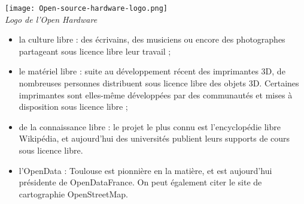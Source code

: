 \begin{minipage}{0.3\textwidth}
\begin{center}
\texttt{[image: Open-source-hardware-logo.png]}\\
\textit{Logo de l’Open Hardware}
\end{center}
\end{minipage}
\begin{minipage}{0.7\textwidth}
\begin{itemize}[label=$\bullet$]
\item la \textcolor{Cdl}{culture libre} : des écrivains, des musiciens 
ou encore des photographes partageant sous licence libre leur travail ;
\item le \textcolor{Cdl}{matériel libre} : suite au développement 
récent des imprimantes 3D, de nombreuses personnes distribuent sous 
licence libre des objets 3D. Certaines imprimantes sont elles-même 
développées par des communautés et mises à disposition sous licence 
libre ;
\item de la \textcolor{Cdl}{connaissance libre} : le projet le plus connu est 
l’encyclopédie libre Wikipédia, et aujourd'hui des universités 
publient leurs supports de cours sous licence libre. 
\item l'\textcolor{Cdl}{OpenData} : Toulouse est pionnière en la matière, 
et est aujourd'hui présidente de OpenDataFrance. On peut également 
citer le site de cartographie \mbox{OpenStreetMap}.
\end{itemize}
\end{minipage}


